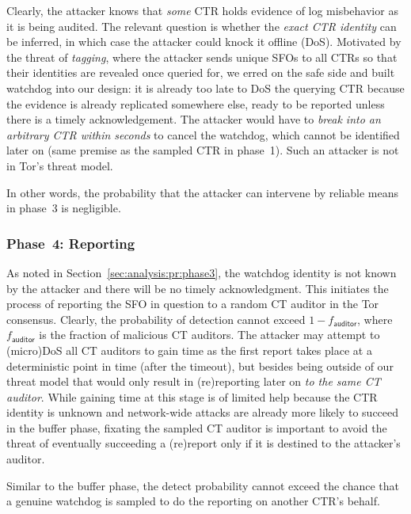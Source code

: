 Clearly, the attacker knows that \emph{some} CTR holds evidence of log
misbehavior as it is being audited.  The relevant question is whether the
\emph{exact CTR identity} can be inferred, in which case the attacker could
knock it offline (DoS).  Motivated by the threat of \emph{tagging}, where the
attacker sends unique SFOs to all CTRs so that their identities are revealed
once queried for, we erred on the safe side and built watchdog into our design:
	it is already too late to DoS the querying CTR because the evidence is
	already replicated somewhere else, ready to be reported unless there is a
	timely acknowledgement.
The attacker would have to \emph{break into an arbitrary CTR within seconds} to
cancel the watchdog, which cannot be identified later on (same premise as
the sampled CTR in phase~1).  Such an attacker is not in Tor's threat model.

In other words, the probability that the attacker can intervene by reliable
means in phase~3 is negligible.

\subsubsection{Phase~4: Reporting} \label{sec:analysis:pr:phase4}
As noted in Section~\ref{sec:analysis:pr:phase3}, the watchdog identity is not
known by the attacker and there will be no timely acknowledgment.  This
initiates the process of reporting the SFO in question to a random CT auditor in
the Tor consensus.  Clearly, the probability of detection cannot exceed
$1-f_{\mathsf{auditor}}$, where $f_{\mathsf{auditor}}$ is the fraction of
malicious CT auditors.  The attacker may attempt to (micro)DoS all CT auditors
to gain time as the first report takes place at a deterministic point in time
(after the timeout), but besides being outside of our threat model that would
only result in (re)reporting later on \emph{to the same CT auditor}.
While gaining time at this stage is of limited help because the CTR identity is
unknown and network-wide attacks are already more likely to succeed in the
buffer phase, fixating the sampled CT auditor is important to avoid the threat
of eventually succeeding a (re)report only if it is destined to the attacker's
auditor.

Similar to the buffer phase, the detect probability cannot exceed the chance
that a genuine watchdog is sampled to do the reporting on another CTR's behalf.
